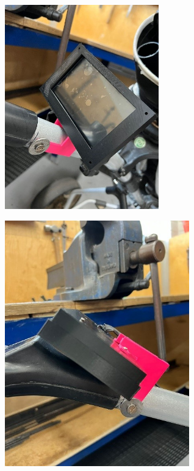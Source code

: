 \documentclass[11pt,landscape]{article}
\newenvironment{Figure}
  {\par\medskip\noindent\minipage{\linewidth}}
  {\endminipage\par\medskip}
\begin{document}
\begin{multicols}{3}
    \begin{Figure}
        \begin{center}
            \includegraphics[width=0.5\textwidth]{Figure17.jpg}
            \label{fig:unfold}
        \end{center}
    \end{Figure}
    
    \begin{Figure}
        \begin{center}
            \includegraphics[width=0.6\textwidth]{Figure18.jpg}
            \label{fig:fold}
        \end{center}
    \end{Figure}
    

\end{multicols}
\end{document}
